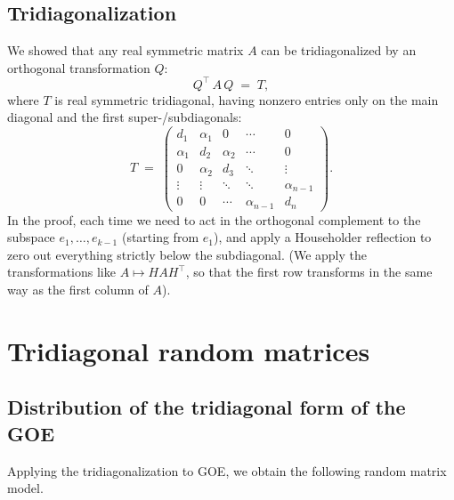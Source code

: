 \documentclass[letterpaper,11pt,oneside,reqno]{book}
\numberwithin{equation}{chapter}  %
\theoremstyle{definition}
\begin{document}
\subsection{Tridiagonalization}

We showed that any real symmetric matrix \(A\) can be tridiagonalized by an orthogonal transformation \(Q\):
\[
	Q^\top\,A\,Q \;=\; T,
\]
where \(T\) is real symmetric tridiagonal, having nonzero entries only on the main diagonal and the first super-/subdiagonals:
\begin{equation*}
	T \;=\;
	\begin{pmatrix}
		 d_1 & \alpha_1 & 0 & \cdots & 0\\
		 \alpha_1 & d_2 & \alpha_2 & \cdots & 0\\
		 0 & \alpha_2 & d_3 & \ddots & \vdots\\
		 \vdots & \vdots & \ddots & \ddots & \alpha_{n-1}\\
		 0 & 0 & \cdots & \alpha_{n-1} & d_n
	\end{pmatrix}.
\end{equation*}
In the proof, each time we need to act in the orthogonal complement to the
subspace $e_1,\ldots,e_{k-1}$ (starting from $e_1$),
and apply a Householder reflection to zero out everything strictly
below the subdiagonal. (We apply the transformations like
$A\mapsto H A H^{\top}$, so that the first row transforms
in the same way as the first column of $A$).

\section{Tridiagonal random matrices}

\subsection{Distribution of the tridiagonal form of the GOE}

Applying the tridiagonalization to GOE, we obtain the following
random matrix model.
\end{document}
